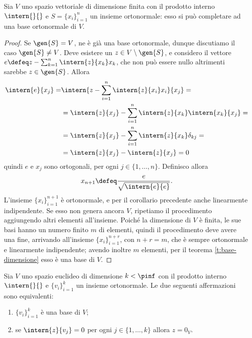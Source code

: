 \begin{teorema}
	Sia $V$ uno spazio vettoriale di dimensione finita con il prodotto interno $\intern{}{}$ e $S=\{  x_i\}_{i=1}^n$ un insieme ortonormale: esso si può completare ad una base ortonormale di $V$.
\end{teorema}
\begin{proof}
	Se $\gen{S}=V$, ne è già una base ortonormale, dunque discutiamo il caso $\gen{S}\neq V$. Deve esistere un $  z\in V\setminus\gen{S}$, e considero il vettore $  e\defeq  z-\sum_{k=1}^n\intern{  z}{  x_k}  x_k$, che non può essere nullo altrimenti sarebbe $  z\in\gen{S}$. Allora
	\begin{equation*}
		\begin{split}
			\intern{  e}{  x_j}=&\intern{  z-\sum_{i=1}^n\intern{  z}{  x_i}  x_i}{  x_j}=\\
				&=\intern{  z}{  x_j}-\sum_{i=1}^n\intern{  z}{  x_k}\intern{  x_k}{  x_j}=\\
				&=\intern{  z}{  x_j}-\sum_{i=1}^n\intern{  z}{  x_k}\delta_{kj}=\\
				&=\intern{  z}{  x_j}-\intern{  z}{  x_j}=0
		\end{split}
	\end{equation*}
	quindi $  e$ e $  x_j$ sono ortogonali, per ogni $j\in\{1,\dots,n\}$.
	Definisco allora
	\begin{equation*}
		  x_{n+1}\defeq \frac{  e}{\sqrt{\intern{  e}{  e}}}.
	\end{equation*}
	L'insieme $\{  x_i\}_{i=1}^{n+1}$ è ortonormale, e per il corollario precedente anche linearmente indipendente.
	Se esso non genera ancora $V$, ripetiamo il procedimento aggiungendo altri elementi all'insieme.
	Poiché la dimensione di $V$ è finita, le sue basi hanno un numero finito $m$ di elementi, quindi il procedimento deve avere una fine, arrivando all'insieme $\{  x_i\}_{i=1}^{n+r}$, con $n+r=m$, che è sempre ortonormale e linearmente indipendente; avendo inoltre $m$ elementi, per il teorema \ref{t:base-dimensione} esso è una base di $V$.
\end{proof}
\begin{teorema}
	Sia $V$ uno spazio euclideo di dimensione $k<\pinf$ con il prodotto interno $\intern{}{}$ e $\{  v_i\}_{i=1}^k$ un insieme ortonormale.
	Le due seguenti affermazioni sono equivalenti:
	\begin{enumerate}
		\item $\{  v_i\}_{i=1}^k$ è una base di $V$;
		\item se $\intern{  z}{  v_j}=0$ per ogni $j\in\{1,\dots,k\}$ allora $  z=0_V$.
	\end{enumerate}
\end{teorema}

